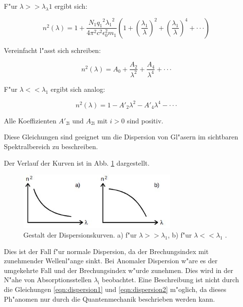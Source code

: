 	F"ur $\lambda >> \lambda_\lambda{1}$ ergibt sich:

	\begin{equation}
		n^2(\lambda) = 1 + \frac{N_\mathrm{1} {q_\mathrm{1}}^2 {\lambda_\mathrm{1}}^2}{4 \pi^2 c^2 \epsilon_\mathrm{0}^2 m_\mathrm{1}} \left( 1 + \left(\frac{\lambda_\mathrm{1}}{\lambda}\right)^2 + \left(\frac{\lambda_\mathrm{1}}{\lambda}\right)^4+ \cdot \cdot \cdot \right) \label{eqn:dispersion1exakt}
	\end{equation}

	Vereinfacht l"asst sich schreiben:

	\begin{equation}
		n^2(\lambda) = A_\mathrm{0} + \frac{A_\mathrm{2}}{\lambda^2} + \frac{A_\mathrm{4}}{\lambda^4} + \cdot \cdot \cdot \label{eqn:dispersion1}
	\end{equation}

	F"ur $\lambda << \lambda_\mathrm{1}$ ergibt sich analog:

	\begin{equation}
		n^2(\lambda) = 1 - A'_\mathrm{2} \lambda^2 - A'_\mathrm{4} \lambda^4 - \cdot \cdot \cdot \label{eqn:dispersion2}
	\end{equation}

	Alle Koeffizienten $A'_\mathrm{2i}$ und $A_\mathrm{2i}$ mit $i>0$ sind positiv.

	Diese Gleichungen sind geeignet um die Dispersion von Gl"asern im sichtbaren Spektralbereich zu beschreiben.

	Der Verlauf der Kurven ist in Abb. \ref{dispersion} dargestellt.

	\begin{figure}[!h]
		\centering
		\includegraphics[width = 8cm]{img/dispersion.JPG}
		\caption{Gestalt der Dispersionskurven. a) f"ur $\lambda >> \lambda_\mathrm{1}$, b) f"ur $\lambda << \lambda_\mathrm{1}$ \cite{anleitung}.}
		\label{dispersion}
	\end{figure}

	Dies ist der Fall f"ur normale Dispersion, da der Brechungsindex mit zunehmender Wellenl"ange sinkt. Bei Anomaler Dispersion w"are es der umgekehrte Fall und der Brechungsindex w"urde zunehmen. Dies wird in der N"ahe von Absorptionsstellen $\lambda_\mathrm{i}$ beobachtet. Eine Beschreibung ist nicht durch die Gleichungen \ref{eqn:dispersion1} und \ref{eqn:dispersion2} m"oglich, da dieses Ph"anomen nur durch die Quantenmechanik beschrieben werden kann.

